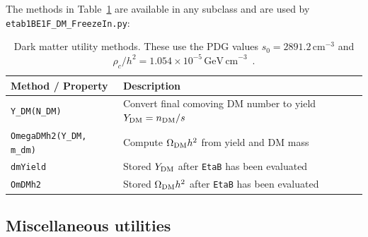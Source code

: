 \documentclass[12pt, a4paper]{article}
\begin{document}
The methods in Table~\ref{tab:ulsbase_dm} are available in any subclass and are used by
\texttt{etab1BE1F\_DM\_FreezeIn.py}:

\begin{table}[H]
\centering\small
\renewcommand{\arraystretch}{1.25}
\begin{tabular}{p{5.2cm} p{8.8cm}}
\hline
\textbf{Method / Property} & \textbf{Description} \\
\hline
\texttt{Y\_DM(N\_DM)}            & Convert final comoving DM number to yield
                                   $Y_{\rm DM}=n_{\rm DM}/s$ \\
\texttt{OmegaDMh2(Y\_DM, m\_dm)} & Compute $\Omega_{\rm DM}h^2$ from yield and DM mass \\
\texttt{dmYield}                 & Stored $Y_{\rm DM}$ after \texttt{EtaB} has been evaluated \\
\texttt{OmDMh2}                  & Stored $\Omega_{\rm DM}h^2$ after \texttt{EtaB} has been evaluated \\
\hline
\end{tabular}
\caption{Dark matter utility methods. These use the PDG values
$s_0=2891.2\,\mathrm{cm}^{-3}$ and $\rho_c/h^2=1.054\times10^{-5}\,\mathrm{GeV\,cm}^{-3}$~\cite{ParticleDataGroup:2024cfk}.}
\label{tab:ulsbase_dm}
\end{table}

\subsection*{Miscellaneous utilities}
\end{document}
